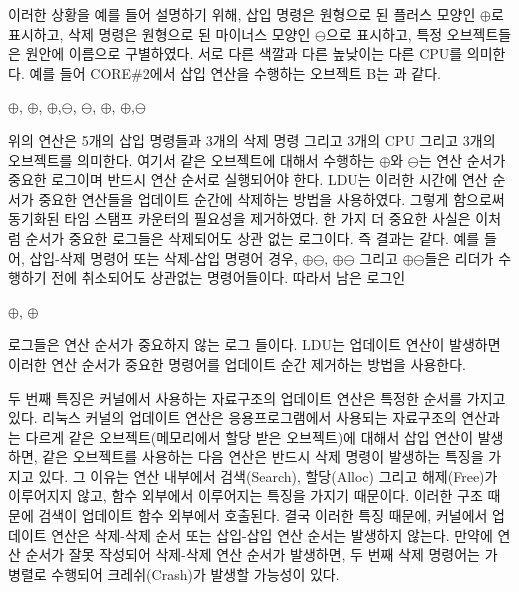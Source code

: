 이러한 상황을 예를 들어 설명하기 위해, 삽입 명령은 원형으로 된 플러스 모양인 $\oplus$로 표시하고, 
삭제 명령은 원형으로 된 마이너스 모양인 $\ominus$으로 표시하고, 
특정 오브젝트들은 원안에 이름으로 구별하였다.
서로 다른 색깔과 다른 높낮이는 다른 CPU를 의미한다. 
예를 들어 CORE\#2에서 삽입 연산을 수행하는 오브젝트 B는 과 같다.

\begin{center}
$\oplus$, $\oplus$, $\oplus$,$\ominus$,
$\ominus$, $\oplus$, $\oplus$,$\ominus$
\end{center}

위의 연산은 5개의 삽입 명령들과 3개의 삭제 명령 그리고 3개의 CPU 그리고 3개의 오브젝트를 의미한다.
여기서 같은 오브젝트에 대해서 수행하는 $\oplus$와 $\ominus$는 
연산 순서가 중요한 로그이며 반드시 연산 순서로 실행되어야 한다.  
LDU는 이러한 시간에 연산 순서가 중요한 연산들을 업데이트 순간에 삭제하는 방법을 사용하였다. 
그렇게 함으로써 동기화된 타임 스탬프 카운터의 필요성을 제거하였다. 
한 가지 더 중요한 사실은 이처럼 순서가 중요한 로그들은 삭제되어도 상관 없는 로그이다. 
즉 결과는 같다.
예를 들어, 삽입-삭제 명령어 또는 삭제-삽입 명령어 경우,
$\oplus$$\ominus$, $\oplus$$\ominus$ 
그리고 $\oplus$$\ominus$들은 리더가 수행하기 전에 취소되어도 상관없는 명령어들이다. 
따라서 남은 로그인 
\begin{center}
 $\oplus$, $\oplus$
\end{center}
로그들은 연산 순서가 중요하지 않는 로그 들이다.
LDU는 업데이트 연산이 발생하면 이러한 연산 순서가 중요한 명령어를 업데이트 순간 제거하는 방법을 
사용한다.

두 번째 특징은 커널에서 사용하는 자료구조의 업데이트 연산은 특정한 순서를 가지고 있다.
리눅스 커널의 업데이트 연산은 응용프로그램에서 사용되는 자료구조의 연산과는 다르게 
같은 오브젝트(메모리에서 할당 받은 오브젝트)에 대해서 삽입 연산이 발생하면, 
같은 오브젝트를 사용하는 다음 연산은 반드시 삭제 명령이 발생하는 특징을 가지고 있다.
그 이유는 연산 내부에서 검색(Search), 할당(Alloc) 그리고 해제(Free)가 이루어지지 않고, 
함수 외부에서 이루어지는 특징을 가지기 때문이다. 
이러한 구조 때문에 검색이 업데이트 함수 외부에서 호출된다. 
결국 이러한 특징 때문에, 커널에서 업데이트 연산은 삭제-삭제 순서 또는 삽입-삽입 
연산 순서는 발생하지 않는다. 
만약에 연산 순서가 잘못 작성되어 삭제-삭제 연산 순서가 발생하면, 두 번째 삭제 명령어는 
가 병렬로 수행되어 크레쉬(Crash)가 발생할 가능성이 있다. 

